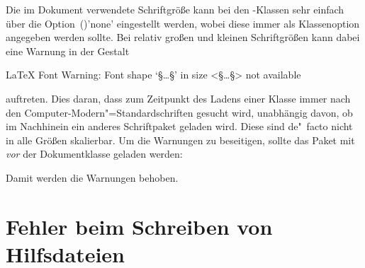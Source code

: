 %
Die im Dokument verwendete Schriftgröße kann bei den \KOMAScript-Klassen sehr 
einfach über die Option~()'none' 
eingestellt werden, wobei diese immer als Klassenoption angegeben werden 
sollte. Bei relativ großen und kleinen Schriftgrößen kann dabei eine Warnung in 
der Gestalt 
%
\begin{quoting}[rightmargin=0pt]
\begin{Code}
LaTeX Font Warning: Font shape `§\dots§' in size <§\dots§> not available
\end{Code}
\end{quoting}
%
auftreten. Dies daran, dass zum Zeitpunkt des Ladens einer Klasse immer nach 
den Computer-Modern"=Standardschriften gesucht wird, unabhängig davon, ob im 
Nachhinein ein anderes Schriftpaket geladen wird. Diese sind de"~facto nicht 
in alle Größen skalierbar. Um die Warnungen zu beseitigen, sollte das Paket 
 mit  \emph{vor} der Dokumentklasse 
geladen werden:
%
\begin{quoting}[rightmargin=0pt]
\end{quoting}
%
Damit werden die Warnungen behoben.



\section{%
  Fehler beim Schreiben von Hilfsdateien%
  \label{sec:tips:write}%
}

